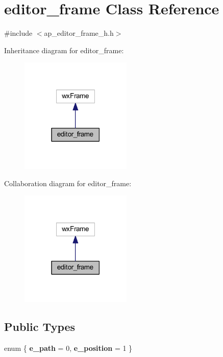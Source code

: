 \section{editor\+\_\+frame Class Reference}
\label{classeditor__frame}


{\ttfamily \#include $<$ap\+\_\+editor\+\_\+frame\+\_\+h.\+h$>$}



Inheritance diagram for editor\+\_\+frame\+:
\nopagebreak
\begin{figure}[H]
\begin{center}
\leavevmode
\includegraphics[width=150pt]{classeditor__frame__inherit__graph}
\end{center}
\end{figure}


Collaboration diagram for editor\+\_\+frame\+:
\nopagebreak
\begin{figure}[H]
\begin{center}
\leavevmode
\includegraphics[width=150pt]{classeditor__frame__coll__graph}
\end{center}
\end{figure}
\subsection*{Public Types}
\begin{DoxyCompactItemize}
\item 
\mbox{\label{classeditor__frame_a06fc87d81c62e9abb8790b6e5713c55b}} 
enum \{ {\bfseries e\+\_\+path} = 0, 
{\bfseries e\+\_\+position} = 1
 \}
\end{DoxyCompactItemize}
